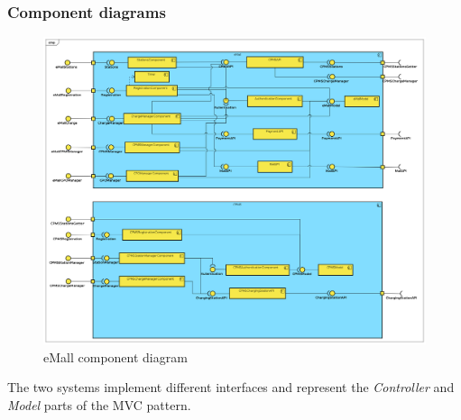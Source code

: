 \subsubsection{Component diagrams}
\begin{figure}[!h]
    \begin{center}
        \includegraphics[keepaspectratio, width=16cm]{Component/Component.png}
        \caption{eMall component diagram}
        \label{fig:eMSP-component}
    \end{center}
\end{figure}
\clearpage
The two systems implement different interfaces and represent the \textit{Controller} and \textit{Model} parts of the \ac{MVC} pattern.

